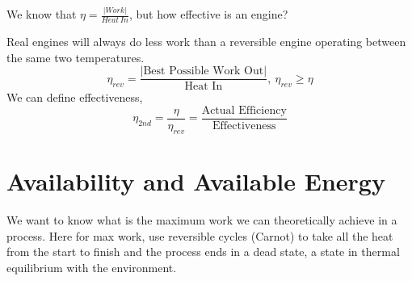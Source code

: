 \documentclass[a4paper, 11pt, normalem]{report}
\begin{document}
We know that $\eta = \frac{|Work|}{Heat\,In}$, but how effective is an engine?

Real engines will always do less work than a reversible engine operating between the same two temperatures.
\begin{equation*}
    \eta_{rev} = \frac{|\text{Best Possible Work Out}|}{\text{Heat In}},~ \eta_{rev} \geq \eta
\end{equation*}
We can define effectiveness,
\begin{equation*}
    \eta_{2nd} = \frac{\eta}{\eta_{rev}} = \frac{\text{Actual Efficiency}}{\text{Effectiveness}}
\end{equation*}

\section{Availability and Available Energy}
We want to know what is the maximum work we can theoretically achieve in a process.
Here for max work, use reversible cycles (Carnot) to take all the heat from the start to finish and the process ends in a dead state, a state in thermal equilibrium with the environment.
\end{document}
